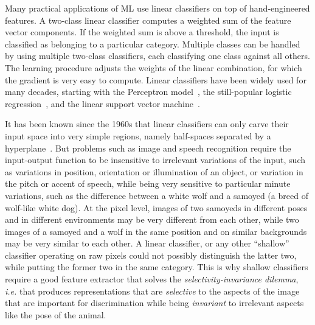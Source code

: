 \documentclass[10pts]{article}
\begin{document}
Many practical applications of ML use linear classifiers on top of
hand-engineered features. A two-class linear classifier computes a
weighted sum of the feature vector components. If the weighted sum is
above a threshold, the input is classified as belonging to a
particular category. Multiple classes can be handled by using multiple
two-class classifiers, each classifying one class against all
others. The learning procedure adjusts the weights of the linear
combination, for which the gradient is very easy to compute. Linear
classifiers have been widely used for many decades, starting with the
Perceptron model~\citep{Rosenblatt57}, the still-popular logistic
regression~\cite{Hastie2001}, and the linear support vector
machine~\cite{Vapnik+Chervonenkis-1964,Boser92}. 

It has been known since the 1960s that linear classifiers can only
carve their input space into very simple regions, namely
half-spaces separated by a hyperplane~\citep{Duda-Hart}.  But problems
such as image and speech recognition require the input-output function
to be insensitive to irrelevant variations of the input, such as
variations in position, orientation or illumination of an object, or
variation in the pitch or accent of speech, while being very sensitive to
particular minute variations, such as the difference between a white
wolf and a samoyed (a breed of wolf-like white dog).  At the pixel
level, images of two samoyeds in different poses and in different
environments may be very different from each other, while two images
of a samoyed and a wolf in the same position and on similar
backgrounds may be very similar to each other. A linear classifier,
or any other ``shallow'' classifier operating on raw pixels could not
possibly distinguish the latter two, while putting the former two in
the same category. This is why shallow classifiers require a good
feature extractor that solves the {\em selectivity-invariance dilemma},
{\it i.e.} that produces representations that are {\em selective} to the
aspects of the image that are important for discrimination while being {\em invariant} to 
irrelevant aspects like the pose of the animal.
%
\end{document}
